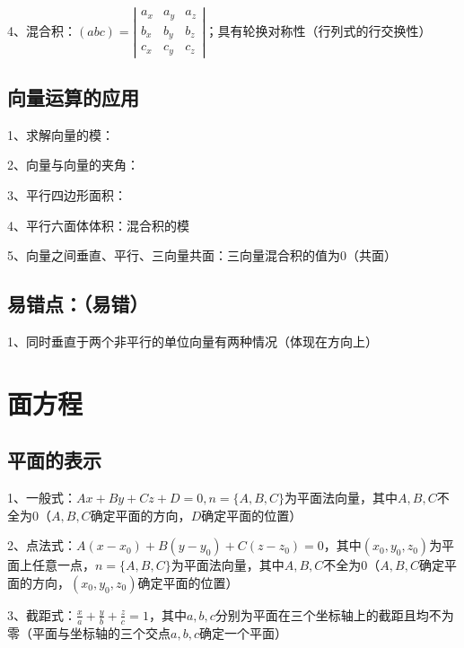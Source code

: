 4、混合积：$(a b c)=\left|\begin{array}{lll}a_{x} & a_{y} & a_{z} \\b_{x} & b_{y} & b_{z} \\c_{x} & c_{y} & c_{z}\end{array}\right|$；具有轮换对称性（行列式的行交换性）



\subsection{向量运算的应用}

1、求解向量的模：

2、向量与向量的夹角：

3、平行四边形面积：

4、平行六面体体积：混合积的模

5、向量之间垂直、平行、三向量共面：三向量混合积的值为0（共面）



\subsection{易错点：（易错）}

1、同时垂直于两个非平行的单位向量有两种情况（体现在方向上）

\section{面方程}



\subsection{平面的表示}

1、一般式：$A x+B y+C z+D=0, n=\{A, B, C\}$为平面法向量，其中$A, B, C$不全为0（$A,B,C$确定平面的方向，$D$确定平面的位置）

2、点法式：$A\left(x-x_{0}\right)+B\left(y-y_{0}\right)+C\left(z-z_{0}\right)=0$，其中$\left(x_{0}, y_{0}, z_{0}\right)$为平面上任意一点，$n=\{A, B, C\}$为平面法向量，其中$A, B, C$不全为0（$A,B,C$确定平面的方向，$\left(x_{0}, y_{0}, z_{0}\right)$确定平面的位置）

3、截距式：$\frac{x}{a}+\frac{y}{b}+\frac{z}{c}=1$，其中$a, b, c$分别为平面在三个坐标轴上的截距且均不为零（平面与坐标轴的三个交点$a, b, c$确定一个平面）



